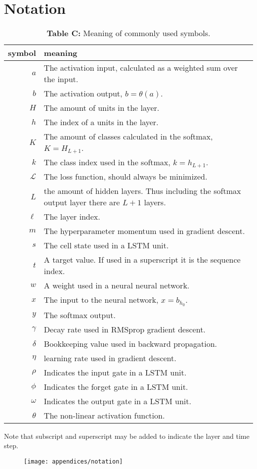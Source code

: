 \chapter{Notation}

\begin{table}[H]
\centering
\begin{tabular}{r p{10cm}}
	symbol & meaning \\ \hline
	$a$ & The activation input, calculated as a weighted sum over the input. \\
	$b$ & The activation output, $b = \theta(a)$. \\
	$H$ & The amount of units in the layer.\\
	$h$ & The index of a units in the layer. \\
	$K$ & The amount of classes calculated in the softmax, $K = H_{L+1}$. \\ 
	$k$ & The class index used in the softmax, $k = h_{L + 1}$.  \\
	$\mathcal{L}$ & The loss function, should always be minimized. \\
	$L$ & the amount of hidden layers. Thus including the softmax output layer there are $L+1$ layers. \\
	$\ell$ & The layer index. \\
	$m$ & The hyperparameter momentum used in gradient descent. \\
	$s$ & The cell state used in a LSTM unit. \\
	$t$ & A target value. If used in a superscript it is the sequence index. \\
	$w$ & A weight used in a neural neural network. \\
	$x$ & The input to the neural network, $x = b_{h_0}$. \\
	$y$ & The softmax output. \\
	$\gamma$ & Decay rate used in RMSprop gradient descent. \\
	$\delta$ & Bookkeeping value used in backward propagation. \\
	$\eta$ & learning rate used in gradient descent. \\
	$\rho$ & Indicates the input gate in a LSTM unit. \\ 
	$\phi$ & Indicates the forget gate in a LSTM unit. \\ 
	$\omega$ & Indicates the output gate in a LSTM unit. \\ 
	$\theta$ & The non-linear activation function.
\end{tabular}
\caption*{\textbf{Table C:} Meaning of commonly used symbols.}
\end{table}

\vspace{-0.1cm}
Note that subscript and superscript may be added to indicate the layer and time step.
\begin{figure}[H]
	\vspace{-0.2cm}
	\centering
	\texttt{[image: appendices/notation]}
\end{figure}
